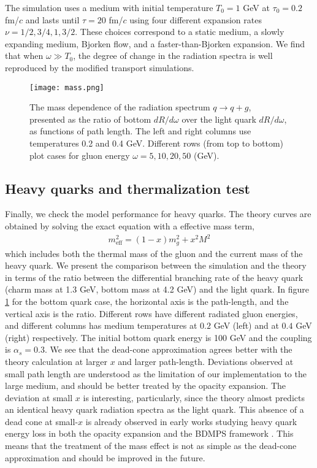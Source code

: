 The simulation uses a medium with initial temperature $T_0=1$ GeV at $\tau_0=0.2$ fm/$c$ and lasts until $\tau = 20$ fm/$c$ using four different expansion rates $\nu = 1/2, 3/4, 1, 3/2$.
These choices correspond to a static medium, a slowly expanding medium, Bjorken flow, and a faster-than-Bjorken expansion.
We find that when $\omega \gg T_0$, the degree of change in the radiation spectra is well reproduced by the modified transport simulations.

\begin{figure}
\texttt{[image: mass.png]}
\caption{The mass dependence of the radiation spectrum $q\rightarrow q+g$, presented as the ratio of bottom $dR/d\omega$ over the light quark $dR/d\omega$, as functions of path length. The left and right columns use temperatures 0.2 and 0.4 GeV. Different rows (from top to bottom) plot cases for gluon energy $\omega = 5, 10, 20, 50$ (GeV).}
\label{fig:mass}
\end{figure}

\subsection{Heavy quarks and thermalization test}
Finally, we check the model performance for heavy quarks.
The theory curves are obtained by solving the exact equation with a effective mass term,
\begin{eqnarray}
m_{\textrm{eff}}^2 = (1-x)m_g^2 + x^2 M^2
\end{eqnarray}
which includes both the thermal mass of the gluon and the current mass of the heavy quark.
We present the comparison between the simulation and the theory in terms of the ratio between the differential branching rate of the heavy quark (charm mass at 1.3 GeV, bottom mass at 4.2 GeV) and the light quark.
In figure \ref{fig:mass} for the bottom quark case, the horizontal axis is the path-length, and the vertical axis is the ratio.
Different rows have different radiated gluon energies, and different  columns has medium temperatures at $0.2$ GeV (left) and at $0.4$ GeV (right) respectively.
The initial bottom quark energy is 100 GeV and the coupling is $\alpha_s=0.3$.
We see that the dead-cone approximation agrees better with the theory calculation at larger $x$ and larger path-length.
Deviations observed at small path length are understood as the limitation of our implementation to the large medium, and should be better treated by the opacity expansion. 
The deviation at small $x$ is interesting, particularly, since the theory almost predicts an identical heavy quark radiation spectra as the light quark. 
This absence of a dead cone at small-$x$ is already observed in early works studying heavy quark energy loss in both the opacity expansion and the BDMPS framework \cite{Armesto:2003jh}.
This means that the treatment of the mass effect is not as simple as the dead-cone approximation and should be improved in the future.

